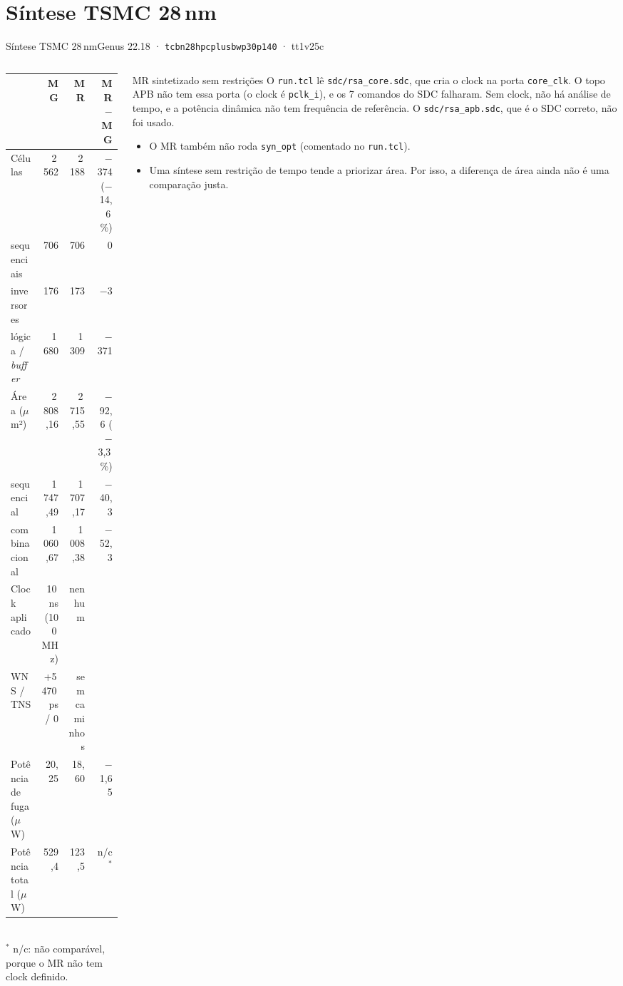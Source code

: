 \documentclass[aspectratio=169,10pt,t]{beamer}
\newcommand{\MG}{\textbf{\color{tmCafe}MG}}
\newcommand{\MR}{\textbf{\color{tmVermelho}MR}}
\begin{document}
\section{Síntese TSMC 28\,nm}
\begin{frame}{Síntese TSMC 28\,nm}{Genus 22.18 · \texttt{tcbn28hpcplusbwp30p140} · tt1v25c}
  \begin{columns}[T]
    \begin{column}{0.63\textwidth}
      \scriptsize
      \renewcommand{\arraystretch}{1.12}
      \setlength{\tabcolsep}{4pt}
      \begin{tabular}{@{}lrrr@{}}
        \toprule
         & \MG & \MR & MR $-$ MG \\
        \midrule
        Células & 2\,562 & 2\,188 & $-$374 \,($-$14,6\,\%) \\
        \quad sequenciais & 706 & 706 & 0 \\
        \quad inversores & 176 & 173 & $-$3 \\
        \quad lógica / \emph{buffer} & 1\,680 & 1\,309 & $-$371 \\
        Área ($\mu$m²) & 2\,808,16 & 2\,715,55 & $-$92,6 ($-$3,3\,\%) \\
        \quad sequencial & 1\,747,49 & 1\,707,17 & $-$40,3 \\
        \quad combinacional & 1\,060,67 & 1\,008,38 & $-$52,3 \\
        \midrule
        Clock aplicado & 10\,ns (100\,MHz) & \alert{nenhum} & \\
        WNS / TNS & +5\,470\,ps / 0 & sem caminhos & \\
        Potência de fuga ($\mu$W) & 20,25 & 18,60 & $-$1,65 \\
        Potência total ($\mu$W) & 529,4 & 123,5 & n/c$^{*}$ \\
        \bottomrule
      \end{tabular}\\[0.05cm]
      {\tiny $^{*}$ n/c: não comparável, porque o MR não tem clock definido.}
    \end{column}
    \begin{column}{0.35\textwidth}
      \begin{alertblock}{MR sintetizado sem restrições}
        \scriptsize
        O \texttt{run.tcl} lê \texttt{sdc/rsa\_core.sdc}, que cria o clock na porta \texttt{core\_clk}. O topo APB não tem essa porta (o clock é \texttt{pclk\_i}), e os 7 comandos do SDC falharam. Sem clock, não há análise de tempo, e a potência dinâmica não tem frequência de referência. O \texttt{sdc/rsa\_apb.sdc}, que é o SDC correto, não foi usado.
      \end{alertblock}
      \scriptsize
      \begin{itemize}
        \item O MR também não roda \texttt{syn\_opt} (comentado no \texttt{run.tcl}).
        \item Uma síntese sem restrição de tempo tende a priorizar área. Por isso, a diferença de área ainda não é uma comparação justa.
      \end{itemize}
    \end{column}
  \end{columns}
\end{frame}
\end{document}
